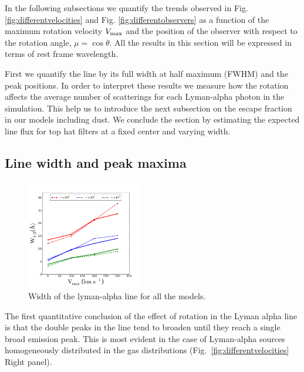 \documentclass[usenatbib]{mn2e}
\begin{document}
In the following subsections we quantify the trends observed in
Fig. \ref{fig:differentvelocities} and
Fig. \ref{fig:differentobservers} as a function of the maximum
rotation velocity $V_{\rm max}$ and the position of the observer with
respect to the rotation angle, $\mu = \cos{\theta}$. All the results
in this section will be expressed in terms of rest frame wavelength.

First we quantify the line by its full width at half maximum
(FWHM) and the peak positions. In order to interpret these results we
measure how the rotation affects the average number of scatterings
for each Lyman-alpha photon in the simulation. This help us to
introduce the next subsection on the escape fraction in our models
including dust. We conclude the section by estimating the
expected line flux for top hat filters at a fixed center and varying
width. 

\subsection{Line width and peak maxima}
\label{sec:widthpeak}
\label{fig:differentvelocities}

\begin{figure}
    \includegraphics[width=0.45\textwidth]{WidthvsVmax.png}
\caption{Width of the lyman-alpha line for all the models.\label{fig:widthvsvelocity}}
\end{figure}



The first quantitative conclusion of the effect of rotation in the
Lyman alpha line is that the double peaks in the line tend to broaden
until they reach a single broad emission peak. This is most evident in
the case of Lyman-alpha sources homogeneously distributed in the gas
distributions (Fig.~\ref{fig:differentvelocities} Right panel).
\end{document}
